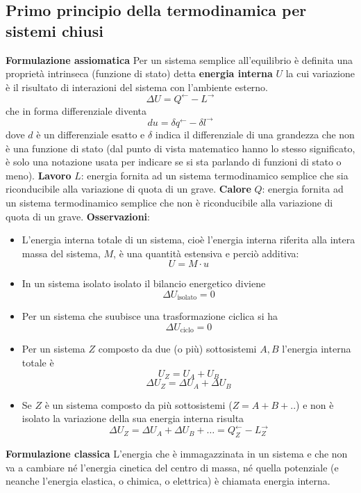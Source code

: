 \subsection{Primo principio della termodinamica per sistemi chiusi}
\textbf{Formulazione assiomatica}\newline
Per un sistema semplice all’equilibrio è definita una proprietà intrinseca (funzione di stato) detta \textbf{energia interna} $U$ la cui variazione è il risultato di interazioni del sistema con l’ambiente esterno.
\[
    \Delta U = Q^\leftarrow - L^\rightarrow
\]
che in forma differenziale diventa
\[
    du = \delta q^\leftarrow - \delta l^\rightarrow 
\]
dove $d$ è un differenziale esatto e $\delta$ indica il differenziale di una grandezza che non è una funzione
di stato (dal punto di vista matematico hanno lo stesso significato, è solo una notazione usata per
indicare se si sta parlando di funzioni di stato o meno).\newline
\newline
\textbf{Lavoro} $L$: energia fornita ad un sistema termodinamico semplice che sia riconducibile alla variazione di quota di un grave.\newline
\newline
\textbf{Calore} $Q$: energia fornita ad un sistema termodinamico semplice che non è riconducibile alla variazione di quota di un grave.\newline
\newline
\textbf{Osservazioni}:
\begin{itemize}
    \item L’energia interna totale di un sistema, cioè l’energia interna riferita alla intera massa del sistema, $M$, è una quantità estensiva e perciò additiva:
    \[
        U = M \cdot u
    \]
    \item In un sistema isolato isolato il bilancio energetico diviene 
    \[
        \Delta U_{\text{isolato}} = 0
    \]
    \item Per un sistema che suubisce una trasformazione ciclica si ha
    \[
        \Delta U_{\text{ciclo}} = 0
    \]
    \item Per un sistema $Z$ composto da due (o più) sottosistemi $A, B$ l'energia interna totale è
    \[
        U_Z = U_A + U_B
    \]
    \[
        \Delta U_Z = \Delta U_A + \Delta U_B
    \]
    \item Se $Z$ è un sistema composto da più sottosistemi ($Z=A+B+..$) e non è isolato la variazione della sua energia interna risulta
    \[
        \Delta U_Z = \Delta U_A + \Delta U_B + \dots = Q_Z^\leftarrow - L_Z^\rightarrow 
    \]
\end{itemize}
\textbf{Formulazione classica}\newline
L’energia che è immagazzinata in un sistema e che non va a cambiare né l’energia cinetica del centro di massa, né quella potenziale (e neanche l’energia elastica, o chimica, o elettrica) è chiamata energia interna.
